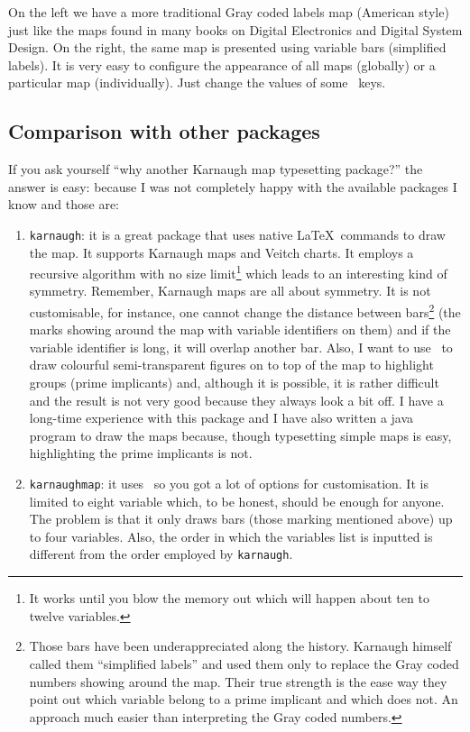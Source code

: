 \documentclass[a4paper]{ltxdoc}
\begin{document}
On the left we have a more traditional Gray coded labels map (American style) just like the maps found in many books on Digital Electronics and Digital System Design. On the right, the same map is presented using variable bars (simplified labels). It is very easy to configure the appearance of all maps (globally) or a particular map (individually). Just change the values of some \tikzname\ keys.


\subsection{Comparison with other packages}

If you ask yourself ``why another Karnaugh map typesetting package?'' the answer is easy: because I was not completely happy with the available packages I know and those are:
\begin{enumerate}
\item \verb|karnaugh|: it is a great package that uses native \LaTeX\ commands to draw the map. It supports Karnaugh maps and Veitch charts. It employs a recursive algorithm with no size limit\footnote{It works until you blow the memory out which will happen about ten to twelve variables.} which leads to an interesting kind of symmetry. Remember, Karnaugh maps are all about symmetry. It is not customisable, for instance, one cannot change the distance between bars\footnote{Those bars have been underappreciated along the history. Karnaugh \cite{Karnaugh} himself called them ``simplified labels'' and used them only to replace the Gray coded numbers showing around the map. Their true strength is the ease way they point out which variable belong to a prime implicant and which does not. An approach much easier than interpreting the Gray coded numbers.} (the marks showing around the map with variable identifiers on them) and if the variable identifier is long, it will overlap another bar. Also, I want to use \tikzname\ to draw colourful semi-transparent figures on to top of the map to highlight groups (prime implicants) and, although it is possible, it is rather difficult and the result is not very good because they always look a bit off. I have a long-time experience with this package and I have also written a java program to draw the maps because, though typesetting simple maps is easy, highlighting the prime implicants is not.
\item \verb|karnaughmap|: it uses \tikzname\ so you got a lot of options for customisation. It is limited to eight variable which, to be honest, should be enough for anyone. The problem is that it only draws bars (those marking mentioned above) up to four variables. Also, the order in which the variables list is inputted is different from the order employed by \verb|karnaugh|.

\end{enumerate}
\end{document}
